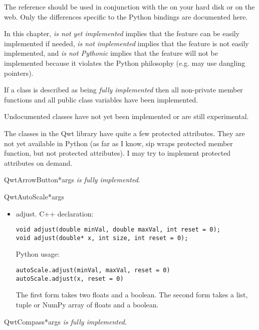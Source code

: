 \documentclass{manual}
\newcommand{\Qwt}{\ulink{Qwt}{http://qwt.sourceforge.net}}
\begin{document}
The reference should be used in conjunction with the
 on your hard disk or \Qwt{} on the web.
Only the differences specific to the Python bindings are documented here.

In this chapter, \emph{is not yet implemented} implies that the feature can
be easily implemented if needed, \emph{is not implemented} implies that the
feature is not easily implemented, and \emph{is not Pythonic} implies that
the feature will not be implemented because it violates the Python philosophy
(e.g. may use dangling pointers).

If a class is described as being \emph{fully implemented} then all non-private
member functions and all public class variables have been implemented.

Undocumented classes have not yet been implemented or are still experimental.

The classes in the Qwt library have quite a few protected attributes.
They are not yet available in Python (as far as I know, sip wraps
protected member function, but not protected attributes).
I may try to implement protected attributes on demand.

\begin{classdesc}{QwtArrowButton}{*args}
\emph{is fully implemented}.
\end{classdesc}

\begin{classdesc}{QwtAutoScale}{*args}

  \begin{itemize}
  
    \item{adjust}. C++ declaration:
      \begin{verbatim}
void adjust(double minVal, double maxVal, int reset = 0);
void adjust(double* x, int size, int reset = 0);
      \end{verbatim}
      Python usage:
      \begin{verbatim}
autoScale.adjust(minVal, maxVal, reset = 0)
autoScale.adjust(x, reset = 0)
    \end{verbatim}
      The first form takes two floats and a boolean.
      The second form takes a list, tuple or NumPy array of floats and a
      boolean.

  \end{itemize}
\end{classdesc}

\begin{classdesc}{QwtCompass}{*args}
\emph{is fully implemented}.
\end{classdesc}
\end{document}
